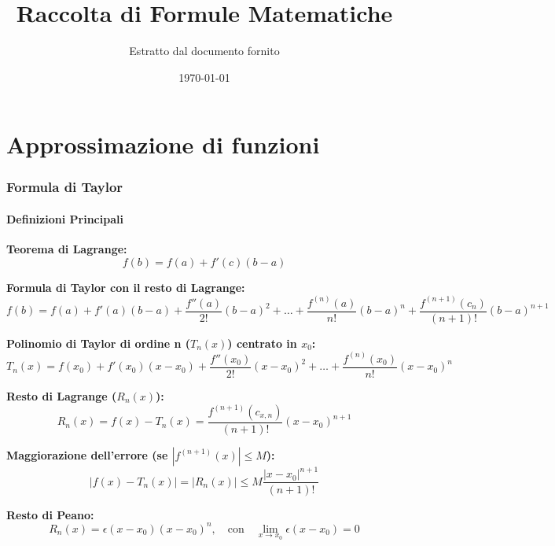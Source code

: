 \documentclass[12pt, a4paper]{article}
\title{Raccolta di Formule Matematiche}
\author{Estratto dal documento fornito}
\date{\today}
\begin{document}
\maketitle

\part{Approssimazione di funzioni}

\section{Formula di Taylor}

\subsection{Definizioni Principali}
\textbf{Teorema di Lagrange:} 
\begin{equation}
f(b) = f(a) + f'(c)(b-a)
\end{equation}

\textbf{Formula di Taylor con il resto di Lagrange:} 
\begin{equation}
f(b) = f(a) + f'(a)(b-a) + \frac{f''(a)}{2!}(b-a)^2 + \dots + \frac{f^{(n)}(a)}{n!}(b-a)^n + \frac{f^{(n+1)}(c_n)}{(n+1)!}(b-a)^{n+1}
\end{equation}

\textbf{Polinomio di Taylor di ordine n ($T_n(x)$) centrato in $x_0$:} 
\begin{equation}
T_n(x) = f(x_0) + f'(x_0)(x-x_0) + \frac{f''(x_0)}{2!}(x-x_0)^2 + \dots + \frac{f^{(n)}(x_0)}{n!}(x-x_0)^n
\end{equation}

\textbf{Resto di Lagrange ($R_n(x)$):} 
\begin{equation}
R_n(x) = f(x) - T_n(x) = \frac{f^{(n+1)}(c_{x,n})}{(n+1)!}(x-x_0)^{n+1}
\end{equation}

\textbf{Maggiorazione dell'errore (se $|f^{(n+1)}(x)| \leq M$):} 
\begin{equation}
|f(x) - T_n(x)| = |R_n(x)| \leq M\frac{|x-x_0|^{n+1}}{(n+1)!}
\end{equation}

\textbf{Resto di Peano:} 
\begin{equation}
R_n(x) = \epsilon(x-x_0)(x-x_0)^n, \quad \text{con} \quad \lim_{x \to x_0} \epsilon(x-x_0) = 0
\end{equation}
\end{document}

